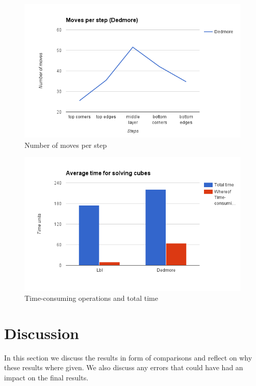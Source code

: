 \documentclass[a4paper,11pt]{kth-mag}
\begin{document}
\begin{figure}[ht!]
	\centering
	\includegraphics[width= 1.0\textwidth]{figs/dedmoresteps.png}
	\caption{Number of moves per step}
	\label{fig_22}
\end{figure}
\begin{figure}[ht!]
	\centering
	\includegraphics[width= 1.0\textwidth]{figs/time.png}
	\caption{Time-consuming operations and total time}
	\label{fig_23}
\end{figure}
\chapter{Discussion}
In this section we discuss the results in form of comparisons and reflect on why these results where given. We also discuss any errors that could have had an impact on the final results.
\end{document}
